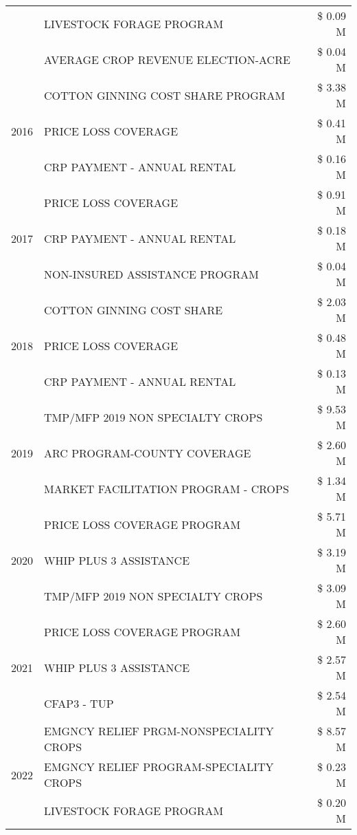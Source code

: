 \begin{tabular}{llr}
 & LIVESTOCK FORAGE PROGRAM & \$ 0.09 M \\
 & AVERAGE CROP REVENUE ELECTION-ACRE & \$ 0.04 M \\
\cline{1-3}
\multirow[t]{3}{*}{2016} & COTTON GINNING COST SHARE PROGRAM & \$ 3.38 M \\
 & PRICE LOSS COVERAGE & \$ 0.41 M \\
 & CRP PAYMENT - ANNUAL RENTAL & \$ 0.16 M \\
\cline{1-3}
\multirow[t]{3}{*}{2017} & PRICE LOSS COVERAGE & \$ 0.91 M \\
 & CRP PAYMENT - ANNUAL RENTAL & \$ 0.18 M \\
 & NON-INSURED ASSISTANCE PROGRAM & \$ 0.04 M \\
\cline{1-3}
\multirow[t]{3}{*}{2018} & COTTON GINNING COST SHARE & \$ 2.03 M \\
 & PRICE LOSS COVERAGE & \$ 0.48 M \\
 & CRP PAYMENT - ANNUAL RENTAL & \$ 0.13 M \\
\cline{1-3}
\multirow[t]{3}{*}{2019} & TMP/MFP 2019 NON SPECIALTY CROPS & \$ 9.53 M \\
 & ARC PROGRAM-COUNTY COVERAGE & \$ 2.60 M \\
 & MARKET FACILITATION PROGRAM - CROPS & \$ 1.34 M \\
\cline{1-3}
\multirow[t]{3}{*}{2020} & PRICE LOSS COVERAGE PROGRAM & \$ 5.71 M \\
 & WHIP PLUS 3 ASSISTANCE & \$ 3.19 M \\
 & TMP/MFP 2019 NON SPECIALTY CROPS & \$ 3.09 M \\
\cline{1-3}
\multirow[t]{3}{*}{2021} & PRICE LOSS COVERAGE PROGRAM & \$ 2.60 M \\
 & WHIP PLUS 3 ASSISTANCE & \$ 2.57 M \\
 & CFAP3 - TUP & \$ 2.54 M \\
\cline{1-3}
\multirow[t]{3}{*}{2022} & EMGNCY RELIEF PRGM-NONSPECIALITY CROPS & \$ 8.57 M \\
 & EMGNCY RELIEF PROGRAM-SPECIALITY CROPS & \$ 0.23 M \\
 & LIVESTOCK FORAGE PROGRAM & \$ 0.20 M \\
\cline{1-3}
\bottomrule
\end{tabular}
